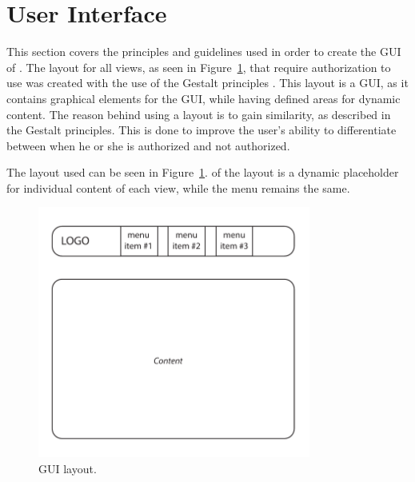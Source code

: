 \section{User Interface}

This section covers the principles and guidelines used in order to create the \ac{GUI} of \projectname{}.
The layout for all views, as seen in Figure~\ref{fig:gui_layout}, that require authorization to use was created with the use of the Gestalt principles \citep{gestalt_principles}.
This layout is a \acs{GUI}, as it contains graphical elements for the \acs{GUI}, while having defined areas for dynamic content.
The reason behind using a layout is to gain similarity, as described in the Gestalt principles.
This is done to improve the user's ability to differentiate between when he or she is authorized and not authorized.

The layout used can be seen in Figure~\ref{fig:gui_layout}.
 of the layout is a dynamic placeholder for individual content of each view, while the menu remains the same.

\begin{figure}[htb]
    \centering
    \includegraphics[width=0.8\textwidth]{gfx/gui_layout.pdf}
    \caption{\acs{GUI} layout.}
    \label{fig:gui_layout}
\end{figure}

